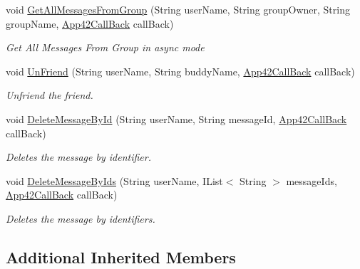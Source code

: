 \begin{DoxyCompactItemize}
void \hyperlink{classcom_1_1shephertz_1_1app42_1_1paas_1_1sdk_1_1csharp_1_1buddy_1_1_buddy_service_a62b1a0cf73486286c0dc50e2148c9ba9}{Get\+All\+Messages\+From\+Group} (String user\+Name, String group\+Owner, String group\+Name, \hyperlink{interfacecom_1_1shephertz_1_1app42_1_1paas_1_1sdk_1_1csharp_1_1_app42_call_back}{App42\+Call\+Back} call\+Back)
\begin{DoxyCompactList}\small\item\em Get All Messages From Group in async mode \end{DoxyCompactList}\item 
void \hyperlink{classcom_1_1shephertz_1_1app42_1_1paas_1_1sdk_1_1csharp_1_1buddy_1_1_buddy_service_ab593136d3164b790a0741350a126758d}{Un\+Friend} (String user\+Name, String buddy\+Name, \hyperlink{interfacecom_1_1shephertz_1_1app42_1_1paas_1_1sdk_1_1csharp_1_1_app42_call_back}{App42\+Call\+Back} call\+Back)
\begin{DoxyCompactList}\small\item\em Unfriend the friend. \end{DoxyCompactList}\item 
void \hyperlink{classcom_1_1shephertz_1_1app42_1_1paas_1_1sdk_1_1csharp_1_1buddy_1_1_buddy_service_a0bfaab3c05ba09a488715e960901a70f}{Delete\+Message\+By\+Id} (String user\+Name, String message\+Id, \hyperlink{interfacecom_1_1shephertz_1_1app42_1_1paas_1_1sdk_1_1csharp_1_1_app42_call_back}{App42\+Call\+Back} call\+Back)
\begin{DoxyCompactList}\small\item\em Deletes the message by identifier. \end{DoxyCompactList}\item 
void \hyperlink{classcom_1_1shephertz_1_1app42_1_1paas_1_1sdk_1_1csharp_1_1buddy_1_1_buddy_service_ad184145b7057db2fc41964f34760da19}{Delete\+Message\+By\+Ids} (String user\+Name, I\+List$<$ String $>$ message\+Ids, \hyperlink{interfacecom_1_1shephertz_1_1app42_1_1paas_1_1sdk_1_1csharp_1_1_app42_call_back}{App42\+Call\+Back} call\+Back)
\begin{DoxyCompactList}\small\item\em Deletes the message by identifiers. \end{DoxyCompactList}\end{DoxyCompactItemize}
\subsection*{Additional Inherited Members}


